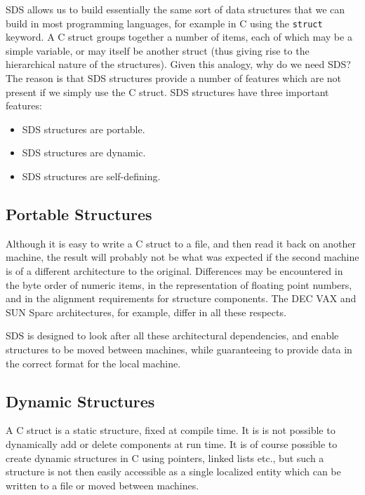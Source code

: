 SDS allows us to build essentially the same sort of data structures that we 
can build in most programming languages, for example in C using the
\verb$struct$ keyword. A C struct groups together a number of items, each of
which may be a simple variable, or may itself be another struct (thus giving
rise to the hierarchical nature of the structures). Given this analogy, why do
we need SDS? The reason is that SDS structures provide a number of features
which are not present if we simply use the C struct. SDS structures have three
important features:

\begin{itemize}

\item SDS structures are portable.

\item SDS structures are dynamic.

\item SDS structures are self-defining.

\end{itemize}

\subsection{Portable Structures}

Although it is easy to write a C struct to a file, and then read it back
on another machine, the result will probably not be what was expected if the
second machine is of a different architecture to the original. Differences may
be encountered in the byte order of numeric items, in the representation of
floating point numbers, and in the alignment requirements for structure
components. The DEC VAX and SUN Sparc architectures, for example, differ in all
these respects.

SDS is designed to look after all these architectural dependencies, and enable
structures to be moved between machines, while guaranteeing to provide data in
the correct format for the local machine.

\subsection{Dynamic Structures}

A C struct is a static structure, fixed at compile time. It is is not possible
to dynamically add or delete components at run time. It is of course possible
to create dynamic structures in C using pointers, linked lists etc., but such
a structure is not then easily accessible as a single localized entity which can
be written to a file or moved between machines.

